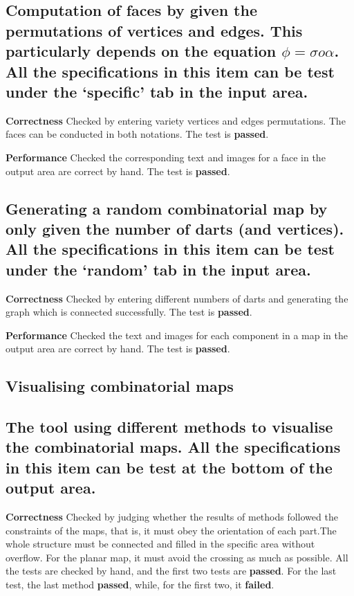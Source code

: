 \subsection*{Computation of faces by given the permutations of vertices and edges. This particularly depends on the equation \(\phi=\sigma o\alpha\). All the specifications in this item can be test under the `specific’ tab in the input area.}

\textbf{Correctness} Checked by entering variety vertices and edges permutations. The faces can be conducted in both notations. The test is \textbf{passed}.

\textbf{Performance} Checked the corresponding text and images for a face in the output area are correct by hand. The test is \textbf{passed}.

\subsection*{Generating a random combinatorial map by only given the number of darts (and vertices). All the specifications in this item can be test under the `random’ tab in the input area.}

\textbf{Correctness} Checked by entering different numbers of  darts and generating the graph which is connected successfully. The test is \textbf{passed}.

\textbf{Performance} Checked the text and images for each component in a map in the output area are correct by hand. The test is \textbf{passed}.

\subsection{Visualising combinatorial maps}

\subsection*{The tool using different methods to visualise the combinatorial maps. All the specifications in this item can be test at the bottom of the output area.}

\textbf{Correctness} Checked by judging whether the results of methods followed the constraints of the maps, that is, it must obey the orientation of each part.The whole structure must be connected and filled in the specific area without overflow. For the planar map, it must avoid the crossing as much as possible. All the tests are checked by hand, and the first two tests are \textbf{passed}. For the last test, the last method \textbf{passed}, while, for the first two, it \textbf{failed}.

